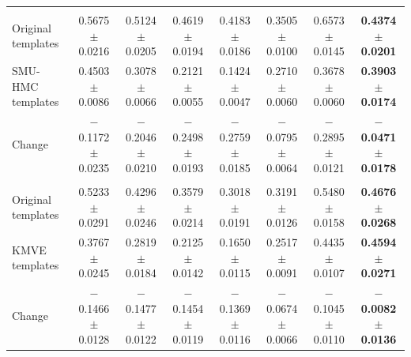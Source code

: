 \documentclass[fleqn,10pt]{wlscirep}
\begin{document}
\begin{appendices}
\begin{table}[p]
\begin{threeparttable}
\begin{tabular}{lccccccc}
\midrule
\rowcolor{gray!20}
\multicolumn{8}{c}{\textbf{KMVE Testset} ($n=492$)} \\
Original templates
& 0.5675$\pm$0.0216
& 0.5124$\pm$0.0205
& 0.4619$\pm$0.0194
& 0.4183$\pm$0.0186
& 0.3505$\pm$0.0100
& 0.6573$\pm$0.0145
& \textbf{0.4374$\pm$0.0201} \\
SMU-HMC templates
& 0.4503$\pm$0.0086
& 0.3078$\pm$0.0066
& 0.2121$\pm$0.0055
& 0.1424$\pm$0.0047
& 0.2710$\pm$0.0060
& 0.3678$\pm$0.0060
& \textbf{0.3903$\pm$0.0174} \\
\quad Change
& $-$0.1172$\pm$0.0235
& $-$0.2046$\pm$0.0210
& $-$0.2498$\pm$0.0193
& $-$0.2759$\pm$0.0185
& $-$0.0795$\pm$0.0064
& $-$0.2895$\pm$0.0121
& \textbf{$-$0.0471$\pm$0.0178} \\

\midrule
\rowcolor{gray!20}
\multicolumn{8}{c}{\textbf{ZJH-TS Testset} ($n=150$)} \\
Original templates
& 0.5233$\pm$0.0291
& 0.4296$\pm$0.0246
& 0.3579$\pm$0.0214
& 0.3018$\pm$0.0191
& 0.3191$\pm$0.0126
& 0.5480$\pm$0.0158
& \textbf{0.4676$\pm$0.0268} \\
KMVE templates
& 0.3767$\pm$0.0245
& 0.2819$\pm$0.0184
& 0.2125$\pm$0.0142
& 0.1650$\pm$0.0115
& 0.2517$\pm$0.0091
& 0.4435$\pm$0.0107
& \textbf{0.4594$\pm$0.0271} \\
\quad Change
& $-$0.1466$\pm$0.0128
& $-$0.1477$\pm$0.0122
& $-$0.1454$\pm$0.0119
& $-$0.1369$\pm$0.0116
& $-$0.0674$\pm$0.0066
& $-$0.1045$\pm$0.0110
& \textbf{$-$0.0082$\pm$0.0136} \\

\bottomrule
\end{tabular}

\end{threeparttable}
\end{table}
\clearpage

\begin{table}[p]
\centering
\begin{threeparttable}
\caption{Safety rules for physician review of AI-generated report drafts.}
\label{tab:safety_rules}

\footnotesize
\setlength{\tabcolsep}{5.0pt}
\renewcommand{\arraystretch}{1.12}


\end{threeparttable}
\end{table}
\end{appendices}
\end{document}
